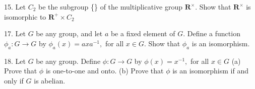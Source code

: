 \begin{mdframed}[style=darkAnswer,frametitle={Joe Starr}]
  
\end{mdframed}
\newpage
\begin{mdframed}[style=darkQuesion]
  15. Let $C_{2}$ be the subgroup \{\} of the multiplicative group $\mathbf{R}^{\times} .$ Show that $\mathbf{R}^{\times}$ is isomorphic to $\mathbf{R}^{+} \times C_{2}$
\end{mdframed}
\begin{mdframed}[style=darkAnswer,frametitle={Joe Starr}]
  
\end{mdframed}
\newpage
\begin{mdframed}[style=darkQuesion]
  17. Let $G$ be any group, and let $a$ be a fixed element of $G .$ Define a function $\phi_{a}: G \rightarrow G$
  by $\phi_{a}(x)=a x a^{-1},$ for all $x \in G .$ Show that $\phi_{a}$ is an isomorphism.
\end{mdframed}
\begin{mdframed}[style=darkAnswer,frametitle={Joe Starr}]
  
\end{mdframed}
\newpage
\begin{mdframed}[style=darkQuesion]
  18. Let $G$ be any group. Define $\phi: G \rightarrow G$ by $\phi(x)=x^{-1},$ for all $x \in G$
  (a) Prove that $\phi$ is one-to-one and onto.
  (b) Prove that $\phi$ is an isomorphism if and only if $G$ is abelian.
\end{mdframed}
